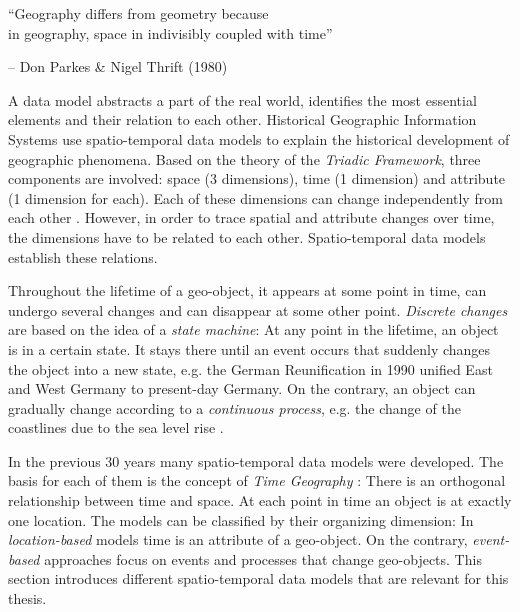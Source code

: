 \begin{quoteit}
  ``Geography differs from geometry because \\
  in geography, space in indivisibly coupled with time''
\end{quoteit}
\hfill -- Don Parkes \& Nigel Thrift (1980)

A data model abstracts a part of the real world, identifies the most essential elements and their relation to each other. Historical Geographic Information Systems use spatio-temporal data models to explain the historical development of geographic phenomena. Based on the theory of the \emph{Triadic Framework}, three components are involved: space (3 dimensions), time (1 dimension) and attribute (1 dimension for each). Each of these dimensions can change independently from each other
\cite[p. 53]{ott2001time}.
However, in order to trace spatial and attribute changes over time, the dimensions have to be related to each other. Spatio-temporal data models establish these relations.

Throughout the lifetime of a geo-object, it appears at some point in time, can undergo several changes and can disappear at some other point. \emph{Discrete changes} are based on the idea of a \emph{state machine}: At any point in the lifetime, an object is in a certain state. It stays there until an event occurs that suddenly changes the object into a new state, e.g. the German Reunification in 1990 unified East and West Germany to present-day Germany. On the contrary, an object can gradually change according to a \emph{continuous process}, e.g. the change of the coastlines due to the sea level rise
\cite{peuquet99}.

In the previous 30 years many spatio-temporal data models were developed. The basis for each of them is the concept of \emph{Time Geography}
\cite{haegerstrand1970}:
There is an orthogonal relationship between time and space. At each point in time an object is at exactly one location. The models can be classified by their organizing dimension: In \emph{location-based} models time is an attribute of a geo-object. On the contrary, \emph{event-based} approaches focus on events and processes that change geo-objects. This section introduces different spatio-temporal data models that are relevant for this thesis.


